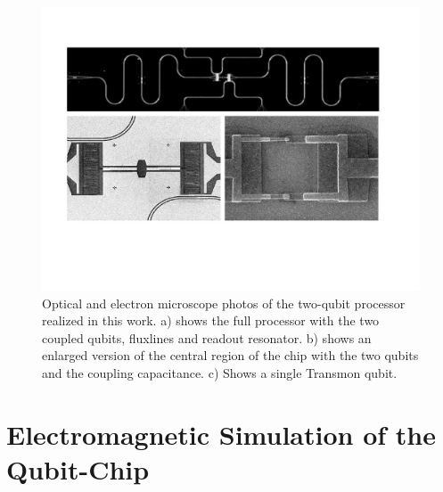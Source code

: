 \begin{figure}
	\includegraphics[width=\textwidth]{"./material/figures/2-qubit-processor/processor photos"}
	\caption{Optical and electron microscope photos of the two-qubit processor realized in this work. a) shows the full processor with the two coupled qubits, fluxlines and readout resonator. b) shows an enlarged version of the central region of the chip with the two qubits and the coupling capacitance. c) Shows a single Transmon qubit.}
	\label{fig:setup_wiring}
\end{figure}

\section{Electromagnetic Simulation of the Qubit-Chip}


